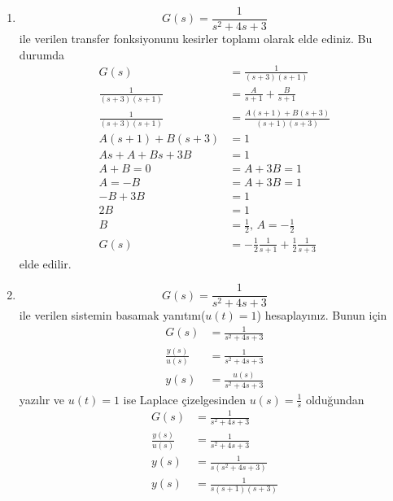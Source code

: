 \begin{enumerate}
    \item 
    \begin{equation}
        G(s)=\frac{1}{s^2+4s+3}
    \end{equation}
    ile verilen transfer fonksiyonunu kesirler toplamı olarak elde ediniz. Bu durumda
    \begin{equation}
    \begin{split}
        G(s)&=\frac{1}{(s+3)(s+1)}\\
        \frac{1}{(s+3)(s+1)}&=\frac{A}{s+1}+\frac{B}{s+1}\\
        \frac{1}{(s+3)(s+1)}&=\frac{A(s+1)+B(s+3)}{(s+1)(s+3)}\\
        A(s+1)+B(s+3)&=1\\
        As+A+Bs+3B&=1\\
        A+B=0\,&=A+3B=1\\
        A=-B\,&=A+3B=1\\
        -B+3B&=1\\
        2B&=1\\
        B&=\frac{1}{2},\,A=-\frac{1}{2}\\
        G(s)&=-\frac{1}{2}\frac{1}{s+1}+\frac{1}{2}\frac{1}{s+3}
    \end{split}
    \end{equation}
    elde edilir.
    \item \begin{equation}
        G(s)=\frac{1}{s^2+4s+3}
    \end{equation} ile verilen sistemin basamak yanıtını($u(t)=1$) hesaplayınız. Bunun için 
    \begin{equation}
        \begin{split}
            G(s)&=\frac{1}{s^2+4s+3}\\
            \frac{y(s)}{u(s)}&=\frac{1}{s^2+4s+3}\\
            y(s)&=\frac{u(s)}{s^2+4s+3}
        \end{split}
    \end{equation}
    yazılır ve $u(t)=1$ ise Laplace çizelgesinden $u(s)=\frac{1}{s}$ olduğundan
    \begin{equation}
        \begin{split}
            G(s)&=\frac{1}{s^2+4s+3}\\
            \frac{y(s)}{u(s)}&=\frac{1}{s^2+4s+3}\\
            y(s)&=\frac{1}{s(s^2+4s+3)}\\
            y(s)&=\frac{1}{s(s+1)(s+3)}

\end{split}
\end{equation}
\end{enumerate}
